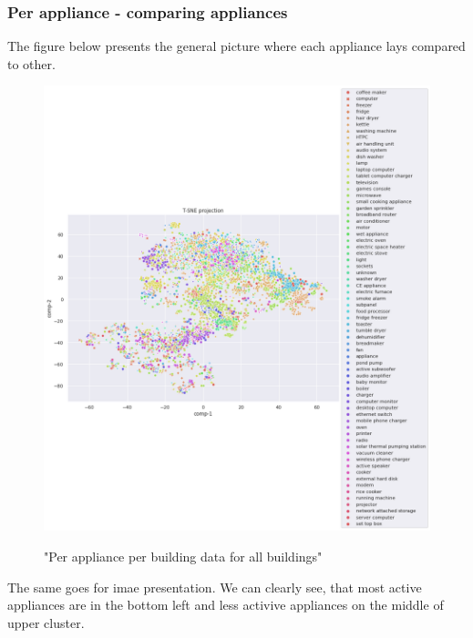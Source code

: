 \subsubsection{Per appliance - comparing appliances}


The figure below \label{fig:tsne_papb_scatter_all} presents
the general picture where each appliance lays compared to other.

\begin{figure}[H]
	\centering
	\caption{"Per appliance per building data for all buildings"}
	\includegraphics[width=1.2\textwidth]{Figures/TSNE/TSNE_results/all/scatter_all_all_lgimgs.png}
	\label{fig:tsne_papb_scatter_all}
\end{figure}

The same goes for imae presentation. We can clearly see, that
most active appliances are in the bottom left
and less activive appliances on the middle of upper cluster.

